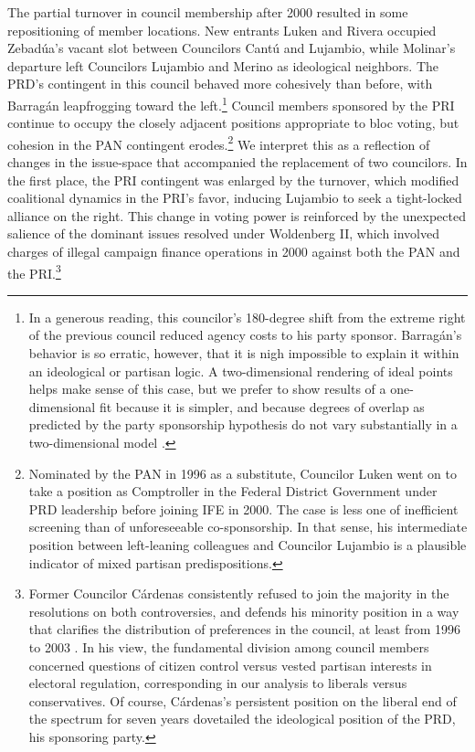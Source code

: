\documentclass[12 pt, letter]{article}
\begin{document}
The partial turnover in council membership after 2000 resulted in some repositioning of member locations.  New entrants Luken and Rivera occupied Zebad\'ua's vacant slot between Councilors Cant\'u and Lujambio, while Molinar's departure left Councilors Lujambio and Merino as ideological neighbors.  The PRD's contingent in this council behaved more cohesively than before, with Barrag\'an leapfrogging toward the left.\footnote{In a generous reading, this councilor's 180-degree shift from the extreme right of the previous council reduced agency costs to his party sponsor.  Barrag\'an's behavior is so erratic, however, that it is nigh impossible to explain it within an ideological or partisan logic.  A two-dimensional rendering of ideal points helps make sense of this case, but we prefer to show results of a one-dimensional fit because it is simpler, and because degrees of overlap as predicted by the party sponsorship hypothesis do not vary substantially in a two-dimensional model \citep[cf.][]{Rosas2005a}.} Council members sponsored by the PRI continue to occupy the closely adjacent positions appropriate to bloc voting, but cohesion in the PAN contingent erodes.\footnote{Nominated by the PAN in 1996 as a substitute, Councilor Luken went on to take a position as Comptroller in the Federal District Government under PRD leadership before joining IFE in 2000.  The case is less one of inefficient screening than of unforeseeable co-sponsorship.  In that sense, his intermediate position between left-leaning colleagues and Councilor Lujambio is a plausible indicator of mixed partisan predispositions.}  We interpret this as a reflection of changes in the issue-space that accompanied the replacement of two councilors.  In the first place, the PRI contingent was enlarged by the turnover, which modified coalitional dynamics in the PRI's favor, inducing Lujambio to seek a tight-locked alliance on the right.  This change in voting power is reinforced by the unexpected salience of the dominant issues resolved under Woldenberg II, which involved charges of illegal campaign finance operations in 2000 against both the PAN and the PRI.\footnote{Former Councilor C\'ardenas consistently refused to join the majority in the resolutions on both controversies, and defends his minority position in a way that clarifies the distribution of preferences in the council, at least from 1996 to 2003 \citep{Cardenas2004}.  In his view, the fundamental division among council members concerned questions of citizen control versus vested partisan interests in electoral regulation, corresponding in our analysis to liberals versus conservatives. Of course, C\'ardenas's persistent position on the liberal end of the spectrum for seven years dovetailed the ideological position of the PRD, his sponsoring party.}
\end{document}
